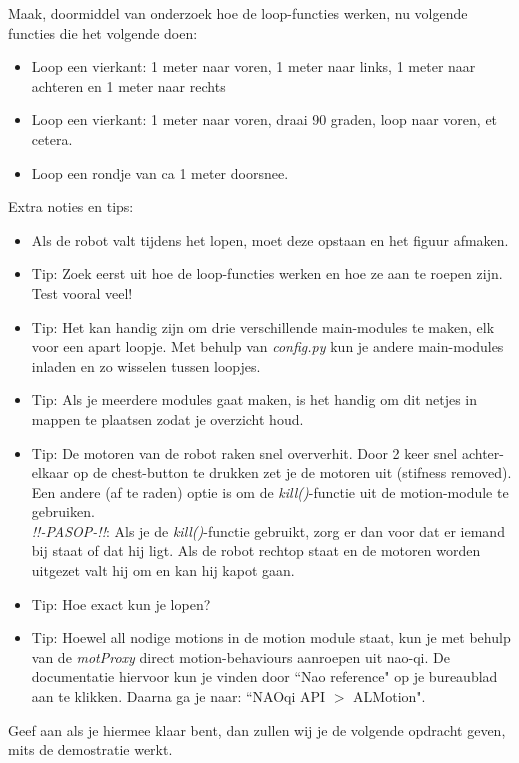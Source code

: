 \documentclass[a4paper]{article}
\begin{document}
Maak, doormiddel van onderzoek hoe de loop-functies werken, nu volgende functies die het volgende doen:
\begin{itemize}
\item Loop een vierkant: 1 meter naar voren, 1 meter naar links, 1 meter naar achteren en 1 meter naar rechts
\item Loop een vierkant: 1 meter naar voren, draai 90 graden, loop naar voren, et cetera.
\item Loop een rondje van ca 1 meter doorsnee.
\end{itemize}

Extra noties en tips:
\begin{itemize}
\item Als de robot valt tijdens het lopen, moet deze opstaan en het figuur afmaken.
\item Tip: Zoek eerst uit hoe de loop-functies werken en hoe ze aan te roepen zijn. Test vooral veel!
\item Tip: Het kan handig zijn om drie verschillende main-modules te maken, elk voor een apart loopje. Met behulp van \textit{config.py} kun je andere main-modules inladen en zo wisselen tussen loopjes.
\item Tip: Als je meerdere modules gaat maken, is het handig om dit netjes in mappen te plaatsen zodat je overzicht houd.
\item Tip: De motoren van de robot raken snel oververhit. Door 2 keer snel achter-elkaar op de chest-button te drukken zet je de motoren uit (stifness removed). Een andere (af te raden) optie is om de \textit{kill()}-functie uit de motion-module te gebruiken.
\\ \textit{!!-PASOP-!!}: Als je de \textit{kill()}-functie gebruikt, zorg er dan voor dat er iemand bij staat of dat hij ligt. Als de robot rechtop staat en de motoren worden uitgezet valt hij om en kan hij kapot gaan.
\item Tip: Hoe exact kun je lopen?
\item Tip: Hoewel all nodige motions in de motion module staat, kun je met behulp van de \textit{motProxy} direct motion-behaviours aanroepen uit nao-qi. De documentatie hiervoor kun je vinden door ``Nao reference" op je bureaublad aan te klikken. Daarna ga je naar: ``NAOqi API $>$ ALMotion". 
\end{itemize}

Geef aan als je hiermee klaar bent, dan zullen wij je de volgende opdracht geven, mits de demostratie werkt.
\end{document}
